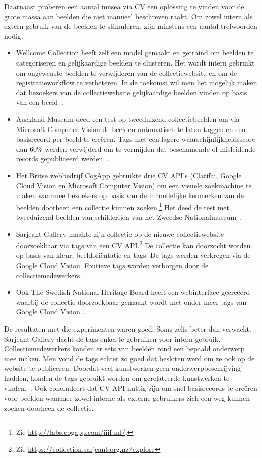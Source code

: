 Daarnaast proberen een aantal musea via CV een oplossing te vinden voor de grote massa aan beelden die niet manueel beschreven raakt. Om zowel intern als extern gebruik van de beelden te stimuleren, zijn minstens een aantal trefwoorden nodig.
\begin{itemize}
	\item Wellcome Collection heeft zelf een model gemaakt en getraind om beelden te categoriseren en gelijkaardige beelden te clusteren. Het wordt intern gebruikt om ongewenste beelden te verwijderen van de collectiewebsite en om de registratieworkflow te verbeteren. In de toekomst wil men het mogelijk maken dat bezoekers van de collectiewebsite gelijkaardige beelden vinden op basis van een beeld~\autocite{Pim2018a}.
	\item Auckland Museum deed een test op tweeduizend collectiebeelden om via Microsoft Computer Vision de beelden automatisch te laten taggen en een basisrecord per beeld te creëren. Tags met een lagere waarschijnlijkheidsscore dan 60\% werden verwijderd om te vermijden dat beschamende of misleidende records gepubliceerd werden~\autocite{Moriarty2018a}.
	\item Het Britse webbedrijf CogApp gebruikte drie CV API’s (Clarifai, Google Cloud Vision en Microsoft Computer Vision) om een visuele zoekmachine te maken waarmee bezoekers op basis van de inhoudelijke kenmerken van de beelden doorheen een collectie kunnen zoeken.\footnote{Zie \url{http://labs.cogapp.com/iiif-ml/}.} Het deed de test met tweeduizend beelden van schilderijen van het Zweedse Nationalmuseum~\autocite{Hindle2017}.
	\item Sarjeant Gallery maakte zijn collectie op de nieuwe collectiewebsite doorzoekbaar via tags van een CV API.\footnote{Zie \url{https://collection.sarjeant.org.nz/explore}} De collectie kan doorzocht worden op basis van kleur, beeldoriëntatie en tags. De tags werden verkregen via de Google Cloud Vision. Foutieve tags worden verborgen door de collectiemedewerkers.~\autocite{Rowe2017} 
	\item Ook The Swedish National Heritage Board heeft een webinterface gecreëerd waarbij de collectie doorzoekbaar gemaakt wordt met onder meer tags van Google Cloud Vision~\autocite{Haskiya2019}.
\end{itemize} 

De resultaten met die experimenten waren goed. Soms zelfs beter dan verwacht. Sarjeant Gallery dacht de tags enkel te gebruiken voor intern gebruik. Collectiemedewerkers konden er sets van beelden rond een bepaald onderwerp mee maken. Men vond de tags echter zo goed dat besloten werd om ze ook op de website te publiceren. Doordat veel kunstwerken geen onderwerpbeschrijving hadden, konden de tags gebruikt worden om gerelateerde kunstwerken te vinden.~\autocite{Rowe2017}. Ook \textcite{Moriarty2018a} concludeert dat CV API nuttig zijn om snel basisrecords te creëren voor beelden waarmee zowel interne als externe gebruikers zich een weg kunnen zoeken doorheen de collectie. 

